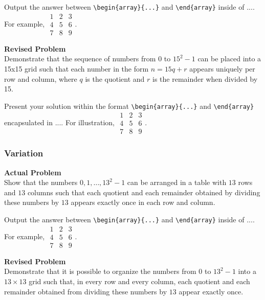 Output the answer between \verb|\begin{array}{...}| and \verb|\end{array}| inside of $\boxed{...}$. For example, $\boxed{\begin{array}{ccc}1 & 2 & 3 \\ 4 & 5 & 6 \\ 7 & 8 & 9\end{array}}$.

\textbf{Revised Problem}\\
Demonstrate that the sequence of numbers from \(0\) to \(15^2 - 1\) can be placed into a 15x15 grid such that each number in the form \(n = 15q + r\) appears uniquely per row and column, where \(q\) is the quotient and \(r\) is the remainder when divided by 15.

Present your solution within the format \verb|\begin{array}{...}| and \verb|\end{array}| encapsulated in $\boxed{...}$. For illustration, $\boxed{\begin{array}{ccc}1 & 2 & 3 \\ 4 & 5 & 6 \\ 7 & 8 & 9\end{array}}$.

\subsubsection{Variation}
\textbf{Actual Problem}\\
Show that the numbers $0,1, \ldots, 13^{2}-1$ can be arranged in a table with $13$ rows and $13$ columns such that each quotient and each remainder obtained by dividing these numbers by $13$ appears exactly once in each row and column.

Output the answer between \verb|\begin{array}{...}| and \verb|\end{array}| inside of $\boxed{...}$. For example, $\boxed{\begin{array}{ccc}1 & 2 & 3 \\ 4 & 5 & 6 \\ 7 & 8 & 9\end{array}}$.

\textbf{Revised Problem}\\
Demonstrate that it is possible to organize the numbers from $0$ to $13^2 - 1$ into a $13 \times 13$ grid such that, in every row and every column, each quotient and each remainder obtained from dividing these numbers by $13$ appear exactly once.

